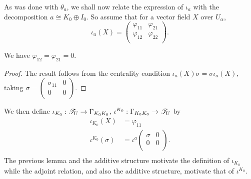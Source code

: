As was done with $\theta_a$, we shall now relate the expression of $\iota_a$ with the decomposition $a\cong K_0\oplus I_0$. So assume that for a vector field $X$ over $U_\alpha$,
$$\iota_a(X)=\left (\begin{smallmatrix} \varphi_{11} & \varphi_{21} \\ \varphi_{12} & \varphi_{22} \\ \end{smallmatrix} \right ).$$

\begin{lemma}
We have $\varphi_{12}=\varphi_{21}=0$.
\end{lemma}
\begin{proof}
The result follows from the centrality condition $\iota_a(X)\sigma =\sigma \iota_a(X)$, taking $\sigma = \left (\begin{smallmatrix} \sigma_{11} & 0 \\ 0 & 0 \\ \end{smallmatrix} \right )$.
\end{proof}

We then define $\iota_{K_0}:\mathscr{T}_U\to \Gamma_{K_0K_0}$, $\iota^{K_0}:\Gamma_{K_0K_0}\to \mathscr{T}_U$ by
$$
\begin{aligned}
\iota_{K_0}(X) &= \varphi_{11} \\
\iota^{K_0}(\sigma ) &= \iota^a \left (\begin{smallmatrix} \sigma & 0 \\ 0 & 0 \\ \end{smallmatrix} \right ).\\
\end{aligned}
$$
The previous lemma and the additive structure motivate the definition of $\iota_{K_0}$ while the adjoint relation, and also the additive structure, motivate that of $\iota^{K_0}$.

